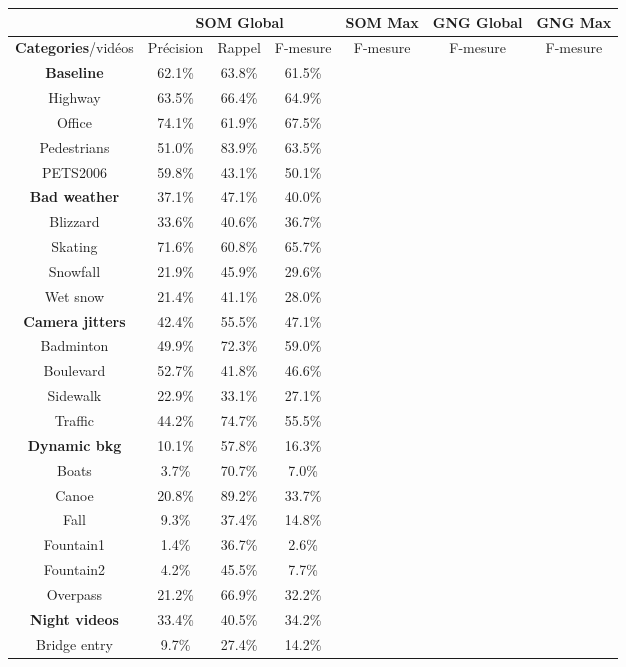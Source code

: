 	\begin{tableth}
    \begin{tabular}{|c|c|c|c|c|c|c|}
		\hline
		& \multicolumn{3}{c|}{SOM Global} & SOM Max & GNG Global & GNG Max\\
        \hline
        \textbf{Categories}/vidéos & Précision & Rappel & F-mesure & F-mesure & F-mesure & F-mesure\\
        \hline
        \textbf{Baseline} & 62.1\% & 63.8\% & 61.5\% & & &\\
		\hline
		Highway & 63.5\% & 66.4\% & 64.9\%& & &\\
		Office & 74.1\% & 61.9\% & 67.5\%& & &\\
		Pedestrians & 51.0\% & 83.9\% & 63.5\% & & &\\
		PETS2006 & 59.8\% & 43.1\% & 50.1\% & & &\\
		\hline
        \textbf{Bad weather} & 37.1\% & 47.1\% & 40.0\% & & &\\
		\hline
		Blizzard & 33.6\% & 40.6\% & 36.7\% & & &\\
		Skating & 71.6\% & 60.8\% & 65.7\% & & &\\
		Snowfall & 21.9\% & 45.9\% & 29.6\% & & &\\
		Wet snow & 21.4\% & 41.1\% & 28.0\% & & &\\
		\hline
        \textbf{Camera jitters} & 42.4\% & 55.5\% & 47.1\% & & &\\
		\hline
		Badminton & 49.9\% & 72.3\% & 59.0\% & & &\\
		Boulevard & 52.7\% & 41.8\% & 46.6\% & & &\\
		Sidewalk & 22.9\% & 33.1\% & 27.1\% & & &\\
		Traffic & 44.2\% & 74.7\% & 55.5\% & & &\\
		\hline
        \textbf{Dynamic bkg} & 10.1\% & 57.8\% & 16.3\% & & &\\
		\hline
		Boats & 3.7\% & 70.7\% & 7.0\% & & &\\
		Canoe & 20.8\% & 89.2\% & 33.7\% & & &\\
		Fall & 9.3\% & 37.4\% & 14.8\% & & &\\
		Fountain1 & 1.4\% & 36.7\% & 2.6\% & & &\\
		Fountain2 & 4.2\% & 45.5\% & 7.7\% & & &\\
		Overpass & 21.2\% & 66.9\% & 32.2\% & & &\\
		\hline
        \textbf{Night videos} & 33.4\% & 40.5\% & 34.2\% & & &\\
		\hline
		Bridge entry & 9.7\% & 27.4\% & 14.2\% & & &\\

\end{tabular}
\end{tableth}
